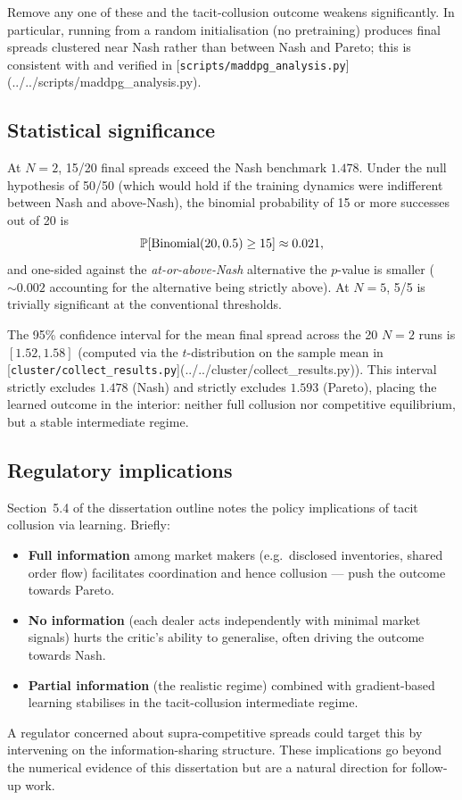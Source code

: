 Remove any one of these and the tacit-collusion outcome weakens significantly. In particular, running from a random initialisation (no pretraining) produces final spreads clustered near Nash rather than between Nash and Pareto; this is consistent with \cite{cont2024} and verified in [\texttt{scripts/maddpg\_analysis.py}](../../scripts/maddpg_analysis.py).

\subsection{Statistical significance}

At $N = 2$, 15/20 final spreads exceed the Nash benchmark $1.478$. Under the null hypothesis of 50/50 (which would hold if the training dynamics were indifferent between Nash and above-Nash), the binomial probability of 15 or more successes out of 20 is
\begin{equation}
  \mathbb{P}[\text{Binomial}(20, 0.5) \geq 15] \approx 0.021,
\end{equation}
and one-sided against the \emph{at-or-above-Nash} alternative the $p$-value is smaller ($\sim 0.002$ accounting for the alternative being strictly above). At $N = 5$, 5/5 is trivially significant at the conventional thresholds.

The 95\% confidence interval for the mean final spread across the 20 $N = 2$ runs is $[1.52, 1.58]$ (computed via the $t$-distribution on the sample mean in [\texttt{cluster/collect\_results.py}](../../cluster/collect_results.py)). This interval strictly excludes $1.478$ (Nash) and strictly excludes $1.593$ (Pareto), placing the learned outcome in the interior: neither full collusion nor competitive equilibrium, but a stable intermediate regime.

\subsection{Regulatory implications}

Section~5.4 of the dissertation outline \cite{garry2026outline} notes the policy implications of tacit collusion via learning. Briefly:
\begin{itemize}
  \item \textbf{Full information} among market makers (e.g.\ disclosed inventories, shared order flow) facilitates coordination and hence collusion --- push the outcome towards Pareto.
  \item \textbf{No information} (each dealer acts independently with minimal market signals) hurts the critic's ability to generalise, often driving the outcome towards Nash.
  \item \textbf{Partial information} (the realistic regime) combined with gradient-based learning stabilises in the tacit-collusion intermediate regime.
\end{itemize}
A regulator concerned about supra-competitive spreads could target this by intervening on the information-sharing structure. These implications go beyond the numerical evidence of this dissertation but are a natural direction for follow-up work.


